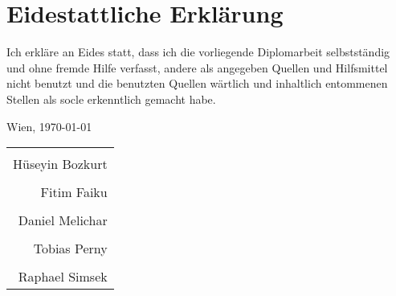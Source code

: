 \section*{Eidestattliche Erklärung}
Ich erkläre an Eides statt, dass ich die vorliegende Diplomarbeit selbstständig und ohne fremde Hilfe verfasst, andere als angegeben Quellen und Hilfsmittel nicht benutzt und die benutzten Quellen wärtlich und inhaltlich entommenen Stellen als socle erkenntlich gemacht habe.

\vspace{0.5cm}

Wien, \today

\vspace{1.5cm}


\begin{flushright}
	\begin{tabular}{r}
	 \makebox[2.5in]{\hrulefill}\\
	 Hüseyin Bozkurt\\[8ex]
	 \makebox[2.5in]{\hrulefill}\\
	 Fitim Faiku\\[8ex]
	 \makebox[2.5in]{\hrulefill}\\
	 Daniel Melichar\\[8ex]
	 \makebox[2.5in]{\hrulefill}\\
	 Tobias Perny\\[8ex]
	 \makebox[2.5in]{\hrulefill}\\
	 Raphael Simsek\\[8ex]
	\end{tabular}
\end{flushright}